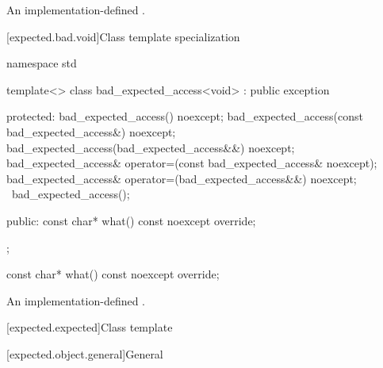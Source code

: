 \begin{itemdescr}
\pnum
\returns
An implementation-defined \ntbs.
\end{itemdescr}

[expected.bad.void]{Class template specialization }

\begin{codeblock}
namespace std {
  template<>
  class bad_expected_access<void> : public exception {
  protected:
    bad_expected_access() noexcept;
    bad_expected_access(const bad_expected_access&) noexcept;
    bad_expected_access(bad_expected_access&&) noexcept;
    bad_expected_access& operator=(const bad_expected_access& noexcept);
    bad_expected_access& operator=(bad_expected_access&&) noexcept;
    ~bad_expected_access();

  public:
    const char* what() const noexcept override;
  };
}
\end{codeblock}

%
\begin{itemdecl}
const char* what() const noexcept override;
\end{itemdecl}

\begin{itemdescr}
\pnum
\returns
An implementation-defined \ntbs.
\end{itemdescr}

[expected.expected]{Class template }

[expected.object.general]{General}

